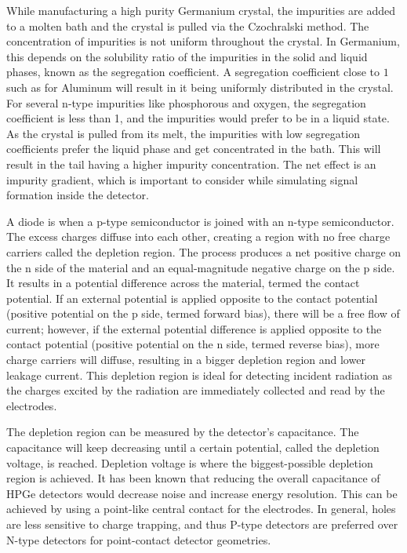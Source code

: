 While manufacturing a high purity Germanium crystal, the impurities are added to a molten bath and the crystal is pulled via the Czochralski method. The concentration of impurities is not uniform throughout the crystal. In Germanium, this depends on the solubility ratio of the impurities in the solid and liquid phases, known as the segregation coefficient. A segregation coefficient close to $1$ such as for Aluminum will result in it being uniformly distributed in the crystal. For several n-type impurities like phosphorous and oxygen, the segregation coefficient is less than 1, and the impurities would prefer to be in a liquid state. As the crystal is pulled from its melt, the impurities with low segregation coefficients prefer the liquid phase and get concentrated in the bath. This will result in the tail having a higher impurity concentration. The net effect is an impurity gradient, which is important to consider while simulating signal formation inside the detector.

A diode is when a p-type semiconductor is joined with an n-type semiconductor. The excess charges diffuse into each other, creating a region with no free charge carriers called the depletion region. The process produces a net positive charge on the n side of the material and an equal-magnitude negative charge on the p side. It results in a potential difference across the material, termed the contact potential. If an external potential is applied opposite to the contact potential (positive potential on the p side, termed forward bias), there will be a free flow of current; however, if the external potential difference is applied opposite to the contact potential (positive potential on the n side, termed reverse bias), more charge carriers will diffuse, resulting in a bigger depletion region and lower leakage current. This depletion region is ideal for detecting incident radiation as the charges excited by the radiation are immediately collected and read by the electrodes.

The depletion region can be measured by the detector's capacitance. The capacitance will keep decreasing until a certain potential, called the depletion voltage, is reached. Depletion voltage is where the biggest-possible depletion region is achieved. It has been known that reducing the overall capacitance of HPGe detectors would decrease noise and increase energy resolution. This can be achieved by using a point-like central contact for the electrodes. In general, holes are less sensitive to charge trapping, and thus P-type detectors are preferred over N-type detectors for point-contact detector geometries.

